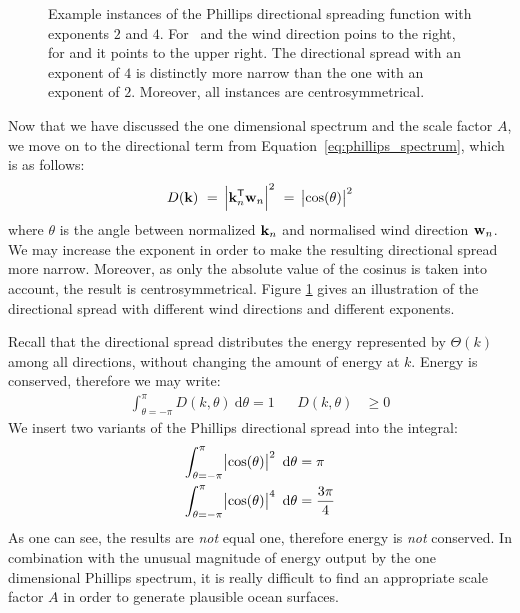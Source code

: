 \begin{figure}
{ }
\caption[Example instances of the Phillips directional spreading function.]{
Example instances of the Phillips directional spreading function with 
exponents $2$ and $4$. For~ and
 the wind direction poins to 
the right, for  and
 it points to the upper right. 
The directional spread with an exponent of $4$ is distinctly more narrow 
than the one with an exponent of $2$. Moreover, all instances are
centrosymmetrical.}
\label{fig:phillips_directional_term}
\end{figure}
%

Now that we have discussed the one dimensional \wavenumber spectrum and the 
scale factor $A$, we move on to the directional term from 
Equation~\ref{eq:phillips_spectrum}, which is as follows:
\begin{equation*}
 D(\mathbf{k})~=~\abs{\mathbf{k}_n^{\mathsf{T}}\mathbf{w}_n}^2~=~\abs{\cos(\theta)}^2
\end{equation*}
where $\theta$ is the angle between normalized \wavevector $\mathbf{k}_n$ and
normalised wind direction $\mathbf{w}_n$.
We may increase the exponent in 
order to make the resulting directional spread more narrow. Moreover, as only
the  absolute value of the cosinus is taken into account, the result is
centrosymmetrical. Figure \ref{fig:phillips_directional_term} gives an
illustration of the directional spread with different wind directions and
different exponents.

Recall that the directional spread distributes the energy represented by
$\Theta(k)$ among all directions, without changing the amount of energy at
\wavenumber $k$. Energy is conserved, therefore we may write:
\begin{align*}
\int_{\theta=-\pi}^{\pi}D(k,\theta)~\mathrm{d}\theta = 1 && D(k,\theta) &\geq 0
\end{align*}
We insert two variants of the Phillips directional spread into the integral:
\begin{align*}
\int_{\theta=-\pi}^{\pi} \abs{\cos(\theta)}^2~\mathrm{d}\theta &= \pi \\
\int_{\theta=-\pi}^{\pi} \abs{\cos(\theta)}^4~\mathrm{d}\theta &= \frac{3\pi}{4}
\end{align*}
As one can see, the results are \emph{not} equal one, therefore energy is 
\emph{not} conserved. In combination with the unusual magnitude of energy 
output by the one dimensional Phillips \wavenumber spectrum, it is really 
difficult to find an appropriate scale factor $A$ in order to generate 
plausible ocean surfaces.
%
